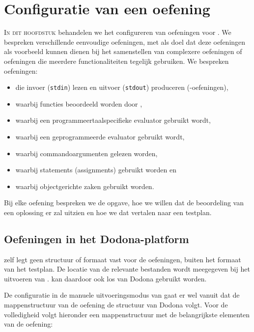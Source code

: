 \chapter{Configuratie van een oefening}\label{ch:nieuwe-oefening}

\lettrine{I}{n dit hoofdstuk} behandelen we het configureren van oefeningen voor \tested{}.
We bespreken verschillende eenvoudige oefeningen, met als doel dat deze oefeningen als voorbeeld kunnen dienen bij het samenstellen van complexere oefeningen of oefeningen die meerdere functionaliteiten tegelijk gebruiken.
We bespreken oefeningen:

\begin{itemize}
    \item die invoer (\texttt{stdin}) lezen en uitvoer (\texttt{stdout}) produceren (-oefeningen),
    \item waarbij functies beoordeeld worden door \tested{},
    \item waarbij een programmeertaalspecifieke evaluator gebruikt wordt,
    \item waarbij een geprogrammeerde evaluator gebruikt wordt,
    \item waarbij commandoargumenten gelezen worden,
    \item waarbij statements (assignments) gebruikt worden en
    \item waarbij objectgerichte zaken gebruikt worden.
\end{itemize}

Bij elke oefening bespreken we de opgave, hoe we willen dat de beoordeling van een oplossing er zal uitzien en hoe we dat vertalen naar een testplan.

\section{Oefeningen in het Dodona-platform}\label{sec:oefeningen-in-het-dodona-platform}

\tested{} zelf legt geen structuur of formaat vast voor de oefeningen, buiten het formaat van het testplan.
De locatie van de relevante bestanden wordt meegegeven bij het uitvoeren van \tested{}.
\tested{} kan daardoor ook los van Dodona gebruikt worden.

De configuratie in de manuele uitvoeringsmodus van \tested{} gaat er wel vanuit dat de mappenstructuur van de oefening de structuur van Dodona volgt.
Voor de volledigheid volgt hieronder een mappenstructuur met de belangrijkste elementen van de oefening:

